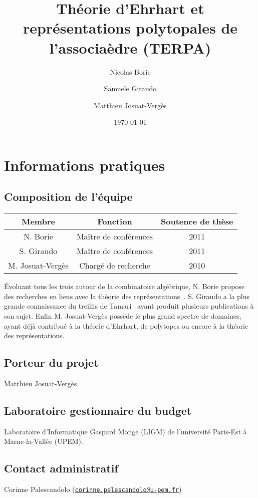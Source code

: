 \documentclass[a4paper, 10pt]{article}
\title{Théorie d'Ehrhart et représentations polytopales de
l'associaèdre (TERPA)}
\date{\today}
\author{Nicolas Borie \and Samuele Giraudo \and Matthieu Josuat-Verg\`es}
\numberwithin{equation}{subsection}
\begin{document}
\maketitle

\section{Informations pratiques}

\subsection*{Composition de l'équipe}
\begin{center}
\begin{tabular}{c|c|c}
    {\bf Membre} & {\bf Fonction} & {\bf Soutence de thèse} \\ \hline
    N. Borie & Maître de conférences & 2011 \\
    S. Giraudo & Maître de conférences & 2011 \\
    M. Josuat-Vergès & Chargé de recherche & 2010
\end{tabular}
\end{center}
Évoluant tous les trois autour de la combinatoire algébrique, N. Borie
propose des recherches en liens avec la théorie des
représentations~\cite{MR3448031}. S. Giraudo a la plus grande
connaissance du treillis de Tamari~\cite{MR2887627} ayant produit
plusieurs publications à son sujet. Enfin M. Josuat-Vergès possède le plus
grand spectre de domaines, ayant déjà contribué à la théorie
d'Ehrhart, de polytopes ou encore à la théorie des représentations.
\medbreak

\subsection*{Porteur du projet}
Matthieu Josuat-Vergès.

\subsection*{Laboratoire gestionnaire du budget}
    Laboratoire d'Informatique Gaspard Monge (LIGM)
    de l'université Paris-Est à Marne-la-Vallée (UPEM).

\subsection*{Contact administratif}
    Corinne Palescandolo
    (\href{mailto:corinne.palescandolo@u-pem.fr}
    {\tt corinne.palescandolo@u-pem.fr})
\medbreak
\end{document}
